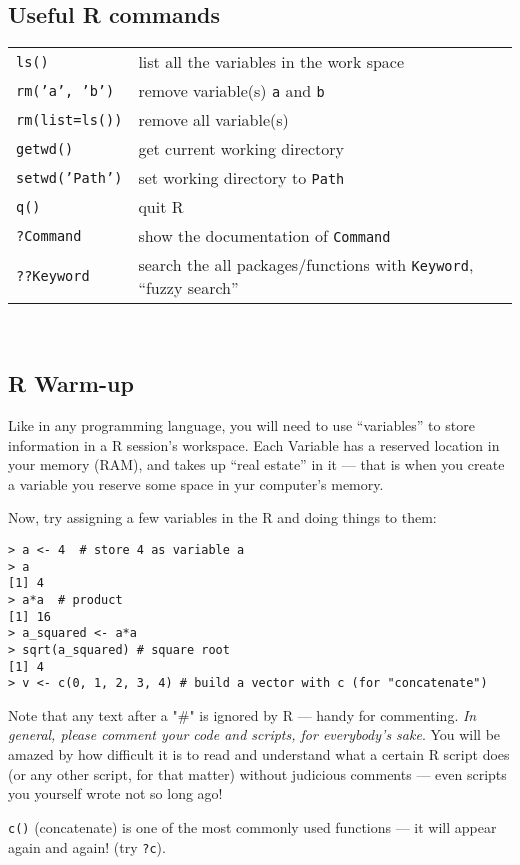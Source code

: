\subsection{Useful R commands}
\begin{tabular}{p{3cm} p{10cm}} 
	{\tt ls()} & list all the variables in the work space \\
	{\tt rm('a', 'b')} & remove variable(s) {\tt a} and {\tt b}\\
	{\tt rm(list=ls())} & remove all variable(s)\\
	{\tt getwd()} & get current working directory \\
	{\tt setwd('Path')} & set working directory to {\tt Path} \\
	{\tt q()} & quit R \\
	{\tt ?Command} & show the documentation of {\tt Command} \\
	{\tt ??Keyword} & search the all packages/functions with 
	{\tt Keyword}, ``fuzzy search''\\
\end{tabular}\\

\subsection{R Warm-up}

Like in any programming language, you will need to use ``variables'' to 
store information in a R session's workspace. Each Variable has a 
reserved location in your memory (RAM), and takes up ``real estate'' in 
it --- that is when you create a variable you reserve some space in yur 
computer's memory.

Now, try assigning a few variables in the R and doing things to them:
\begin{lstlisting}
> a <- 4  # store 4 as variable a
> a
[1] 4
> a*a  # product
[1] 16
> a_squared <- a*a 
> sqrt(a_squared) # square root
[1] 4
> v <- c(0, 1, 2, 3, 4) # build a vector with c (for "concatenate") 
\end{lstlisting}

Note that any text after a "\#" is ignored by R --- handy for 
commenting. {\it In general, please comment your code and scripts, for 
{\it everybody's} sake}. You will be amazed by how difficult it is to 
read and understand what a certain R script does (or any other script, 
for that matter) without judicious comments --- even scripts you  
yourself wrote not so long ago!

\begin{tipbox}
{\tt c()} (concatenate) is one of the most commonly used 
functions --- it will appear again and again! (try {\tt ?c}). 
\end{tipbox}

